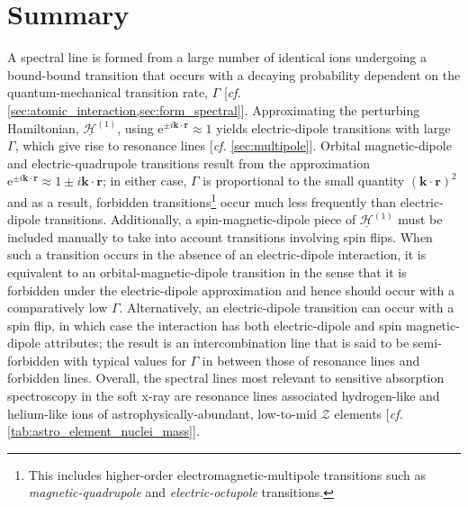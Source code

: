 \section{Summary}\label{sec:apBsummary}
A spectral line is formed from a large number of identical ions undergoing a bound-bound transition that occurs with a decaying probability dependent on the quantum-mechanical transition rate, $\Gamma$ [\emph{cf.\@} \cref{sec:atomic_interaction,sec:form_spectral}]. 
Approximating the perturbing Hamiltonian, $\underline{\mathcal{H}}^{(1)}$, using $\mathrm{e}^{\pm i \mathbold{k} \cdot \mathbold{r}} \approx 1$ yields electric-dipole transitions with large $\Gamma$, which give rise to resonance lines [\emph{cf.\@} \cref{sec:multipole}]. 
Orbital magnetic-dipole and electric-quadrupole transitions result from the approximation $\mathrm{e}^{\pm i \mathbold{k} \cdot \mathbold{r}} \approx 1 \pm i \mathbold{k} \cdot \mathbold{r}$; in either case, $\Gamma$ is proportional to the small quantity $\left( \mathbold{k} \cdot \mathbold{r} \right)^2$ and as a result, forbidden transitions\footnote{This includes higher-order electromagnetic-multipole transitions such as \emph{magnetic-quadrupole} and \emph{electric-octupole} transitions.} occur much less frequently than electric-dipole transitions. 
Additionally, a spin-magnetic-dipole piece of $\underline{\mathcal{H}}^{(1)}$ must be included manually to take into account transitions involving spin flips. 
When such a transition occurs in the absence of an electric-dipole interaction, it is equivalent to an orbital-magnetic-dipole transition in the sense that it is forbidden under the electric-dipole approximation and hence should occur with a comparatively low $\Gamma$. 
Alternatively, an electric-dipole transition can occur with a spin flip, in which case the interaction has both electric-dipole and spin magnetic-dipole attributes; the result is an intercombination line that is said to be semi-forbidden with typical values for $\Gamma$ in between those of resonance lines and forbidden lines. 
Overall, the spectral lines most relevant to sensitive absorption spectroscopy in the soft x-ray are resonance lines associated hydrogen-like and helium-like ions of astrophysically-abundant, low-to-mid $\mathcal{Z}$ elements [\emph{cf.\@} \cref{tab:astro_element_nuclei_mass}].
